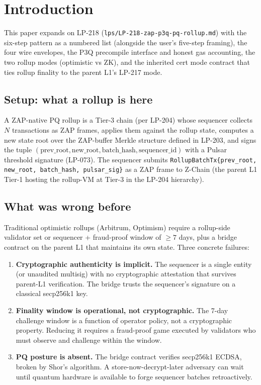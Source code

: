 \section{Introduction}

This paper expands on LP-218
(\texttt{lps/LP-218-zap-p3q-pq-rollup.md}) with the six-step pattern
as a numbered list (alongside the user's five-step framing), the
four wire envelopes, the P3Q precompile interface and honest gas
accounting, the two rollup modes (optimistic vs ZK), and the
inherited cert mode contract that ties rollup finality to the
parent L1's LP-217 mode.

\subsection{Setup: what a rollup is here}

A ZAP-native PQ rollup is a Tier-3 chain (per LP-204) whose
sequencer collects $N$ transactions as ZAP frames, applies them
against the rollup state, computes a new state root over the
ZAP-buffer Merkle structure defined in LP-203, and signs the tuple
$(\textrm{prev\_root}, \textrm{new\_root}, \textrm{batch\_hash},
\textrm{sequencer\_id})$ with a Pulsar threshold signature (LP-073).
The sequencer submits
\texttt{RollupBatchTx\{prev\_root, new\_root, batch\_hash, pulsar\_sig\}}
as a ZAP frame to Z-Chain (the parent L1 Tier-1 hosting the
rollup-VM at Tier-3 in the LP-204 hierarchy).

\subsection{What was wrong before}

Traditional optimistic rollups (Arbitrum, Optimism) require a
rollup-side validator set or sequencer + fraud-proof window of
$\geq 7$ days, plus a bridge contract on the parent L1 that maintains
its own state. Three concrete failures:

\begin{enumerate}[leftmargin=2em,nosep]
\item \textbf{Cryptographic authenticity is implicit.} The sequencer
  is a single entity (or unaudited multisig) with no cryptographic
  attestation that survives parent-L1 verification. The bridge
  trusts the sequencer's signature on a classical secp256k1 key.
\item \textbf{Finality window is operational, not cryptographic.}
  The 7-day challenge window is a function of operator policy, not
  a cryptographic property. Reducing it requires a fraud-proof
  game executed by validators who must observe and challenge within
  the window.
\item \textbf{PQ posture is absent.} The bridge contract verifies
  secp256k1 ECDSA, broken by Shor's algorithm. A
  store-now-decrypt-later adversary can wait until quantum hardware
  is available to forge sequencer batches retroactively.
\end{enumerate}

